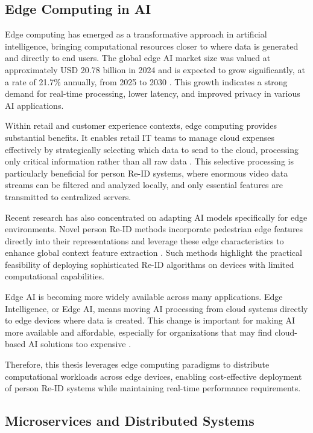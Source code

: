 \documentclass[../main.tex]{subfiles}
\begin{document}
\subsection{Edge Computing in AI}
\label{sec:edgecomputing}

Edge computing has emerged as a transformative approach in artificial intelligence, bringing computational resources closer to where data is generated and directly to end users. The global edge AI market size was valued at approximately USD 20.78 billion in 2024 and is expected to grow significantly, at a rate of 21.7\% annually, from 2025 to 2030 \cite{grandview2024}. This growth indicates a strong demand for real-time processing, lower latency, and improved privacy in various AI applications.

Within retail and customer experience contexts, edge computing provides substantial benefits. It enables retail IT teams to manage cloud expenses effectively by strategically selecting which data to send to the cloud, processing only critical information rather than all raw data \cite{biztech2024}. This selective processing is particularly beneficial for person Re-ID systems, where enormous video data streams can be filtered and analyzed locally, and only essential features are transmitted to centralized servers.

Recent research has also concentrated on adapting AI models specifically for edge environments. Novel person Re-ID methods incorporate pedestrian edge features directly into their representations and leverage these edge characteristics to enhance global context feature extraction \cite{mdpi2024_edge}. Such methods highlight the practical feasibility of deploying sophisticated Re-ID algorithms on devices with limited computational capabilities.

Edge AI is becoming more widely available across many applications. Edge Intelligence, or Edge AI, means moving AI processing from cloud systems directly to edge devices where data is created. This change is important for making AI more available and affordable, especially for organizations that may find cloud-based AI solutions too expensive \cite{viso2024}.

Therefore, this thesis leverages edge computing paradigms to distribute computational workloads across edge devices, enabling cost-effective deployment of person Re-ID systems while maintaining real-time performance requirements.

\subsection{Microservices and Distributed Systems}
\label{sec:microservice}
\end{document}
